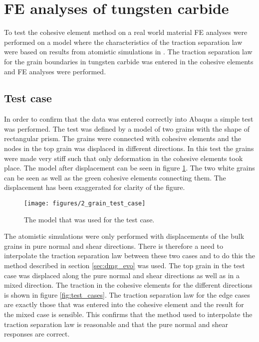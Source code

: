 \documentclass[wcco.tex]{subfiles}
\begin{document}
\FloatBarrier


\section{FE analyses of tungsten carbide}

To test the cohesive element method on a real world material FE analyses were performed on a model where the characteristics of the traction separation law were based on results from atomistic simulations in \cite{Gren2013}. The traction separation law for the grain boundaries in tungsten carbide was entered in the cohesive elements and FE analyses were performed.
 
\subsection{Test case} 

  In order to confirm that the data was entered correctly into Abaqus a simple test was performed. The test was defined by a model of two grains with the shape of rectangular prism. The grains were connected with cohesive elements and the nodes in the top grain was displaced in different directions. In this test the grains were made very stiff such that only deformation in the cohesive elements took place. The model after displacement can be seen in figure \ref{fig:2_grain_test_case}. The two white grains can be seen as well as the green cohesive elements connecting them. The displacement has been exaggerated for clarity of the figure.

\begin{figure}[ht]
\centering
\texttt{[image: figures/2\_grain\_test\_case]}
\caption{The model that was used for the test case.}
\label{fig:2_grain_test_case}
\end{figure}

The atomistic simulations were only performed with displacements of the bulk grains in pure normal and shear directions. There is therefore a need to interpolate the traction separation law between these two cases and to do this the method described in section \ref{sec:dmg_evo} was used. The top grain in the test case was displaced along the pure normal and shear directions as well as in a mixed direction. The traction in the cohesive elements for the different directions is shown in figure \ref{fig:test_cases}. The traction separation law for the edge cases are exactly those that was entered into the cohesive element and the result for the mixed case is sensible. This confirms that the method used to interpolate the traction separation law is reasonable and that the pure normal and shear responses are correct.
\end{document}
